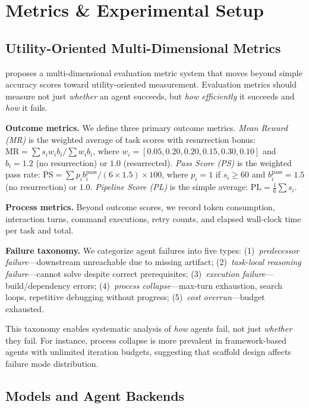 \section{Metrics \& Experimental Setup}

\subsection{Utility-Oriented Multi-Dimensional Metrics}

\eva{} proposes a multi-dimensional evaluation metric system that moves beyond simple accuracy scores toward utility-oriented measurement.
Evaluation metrics should measure not just \emph{whether} an agent succeeds, but \emph{how efficiently} it succeeds and \emph{how} it fails.

\textbf{Outcome metrics.}
We define three primary outcome metrics.
\emph{Mean Reward (MR)} is the weighted average of task scores with resurrection bonus: $\text{MR} = \sum s_i w_i b_i / \sum w_i b_i$, where $w_i = [0.05, 0.20, 0.20, 0.15, 0.30, 0.10]$ and $b_i = 1.2$ (no resurrection) or $1.0$ (resurrected).
\emph{Pass Score (PS)} is the weighted pass rate: $\text{PS} = \sum p_i b_i^{\text{pass}} / (6 \times 1.5) \times 100$, where $p_i = 1$ if $s_i \geq 60$ and $b_i^{\text{pass}} = 1.5$ (no resurrection) or $1.0$.
\emph{Pipeline Score (PL)} is the simple average: $\text{PL} = \frac{1}{6}\sum s_i$.

\textbf{Process metrics.}
Beyond outcome scores, we record token consumption, interaction turns, command executions, retry counts, and elapsed wall-clock time per task and total.

\textbf{Failure taxonomy.}
We categorize agent failures into five types:
(1)~\emph{predecessor failure}---downstream unreachable due to missing artifact;
(2)~\emph{task-local reasoning failure}---cannot solve despite correct prerequisites;
(3)~\emph{execution failure}---build/dependency errors;
(4)~\emph{process collapse}---max-turn exhaustion, search loops, repetitive debugging without progress;
(5)~\emph{cost overrun}---budget exhausted.

This taxonomy enables systematic analysis of \emph{how} agents fail, not just \emph{whether} they fail.
For instance, process collapse is more prevalent in framework-based agents with unlimited iteration budgets, suggesting that scaffold design affects failure mode distribution.

\subsection{Models and Agent Backends}

